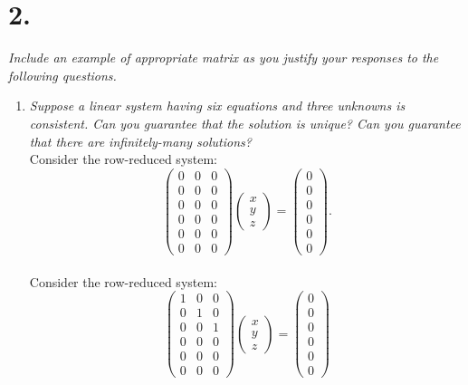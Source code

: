 \documentclass[12pt]{article}
\begin{document}
\section*{2.}
\textit{Include an example of appropriate matrix as you justify your responses
to the following questions.}
\begin{enumerate}[label=(\alph*)]
	\item \textit{Suppose a linear system having six equations and three
	unknowns is consistent.
	Can you guarantee that the solution is unique?
	Can you guarantee that there are infinitely-many solutions?}
	\\[\baselineskip]
	Consider the row-reduced system:
	\begin{equation*}
		\begin{pmatrix}
			0 & 0 & 0 \\
			0 & 0 & 0 \\
			0 & 0 & 0 \\
			0 & 0 & 0 \\
			0 & 0 & 0 \\
			0 & 0 & 0
		\end{pmatrix}
		\begin{pmatrix} x \\ y \\ z \end{pmatrix}
		=
		\begin{pmatrix} 0 \\ 0 \\ 0 \\ 0 \\ 0 \\ 0 \end{pmatrix}
		.
	\end{equation*}
	\\[\baselineskip]
	Consider the row-reduced system:
	\begin{equation*}
		\begin{pmatrix}
			1 & 0 & 0 \\
			0 & 1 & 0 \\
			0 & 0 & 1 \\
			0 & 0 & 0 \\
			0 & 0 & 0 \\
			0 & 0 & 0
		\end{pmatrix}
		\begin{pmatrix} x \\ y \\ z \end{pmatrix}
		=
		\begin{pmatrix} 0 \\ 0 \\ 0 \\ 0 \\ 0 \\ 0 \end{pmatrix}

\end{equation*}
\end{enumerate}
\end{document}
